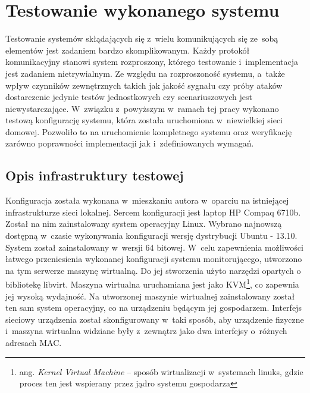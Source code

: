 \chapter{Testowanie wykonanego systemu}
\label{chap:Testy}

Testowanie systemów skłądających się z~wielu komunikujących się
ze~sobą elementów jest zadaniem bardzo skomplikowanym. Każdy protokół
komunikacyjny stanowi system rozproszony, którego testowanie
i~implementacja jest zadaniem nietrywialnym. Ze względu na
rozproszoność systemu, a~także wpływ czynników zewnętrznych takich jak
jakość sygnału czy próby ataków dostarczenie jedynie testów
jednostkowych czy scenariuszowych jest niewystarczające. W~związku
z~powyższym w~ramach tej pracy wykonano testową konfigurację systemu,
która została uruchomiona w~niewielkiej sieci domowej. Pozwoliło to na
uruchomienie kompletnego systemu oraz weryfikację zarówno poprawności
implementacji jak i~zdefiniowanych wymagań.

\section[Opis infrastruktury][Opis infrastruktury testowej]{Opis infrastruktury testowej}

Konfiguracja została wykonana w~mieszkaniu autora w~oparciu na
istniejącej infrastrukturze sieci lokalnej. Sercem konfiguracji jest
laptop HP Compaq 6710b. Został na nim zainstalowany system operacyjny
Linux. Wybrano najnowszą dostępną w~czasie wykonywania konfiguracji
wersję dystrybucji Ubuntu - 13.10. System został zainstalowany
w~wersji 64 bitowej. W~celu zapewnienia możliwości łatwego
przeniesienia wykonanej konfiguracji systemu monitorującego, utworzono
na tym serwerze maszynę wirtualną. Do jej stworzenia użyto narzędzi
opartych o bibliotekę libvirt. Maszyna wirtualna uruchamiana jest jako
KVM\footnote{ang. {\em Kernel Virtual Machine} -- sposób wirtualizacji
  w~systemach linuks, gdzie proces ten jest wspierany przez jądro
  systemu gospodarza}, co zapewnia jej wysoką wydajność. Na utworzonej
maszynie wirtualnej zainstalowany został ten sam system operacyjny, co
na urządzeniu będącym jej gospodarzem. Interfejs sieciowy urządzenia
został skonfigurowany w~taki sposób, aby urządzenie fizyczne i~maszyna
wirtualna widziane były z~zewnątrz jako dwa interfejsy o~różnych
adresach MAC.

